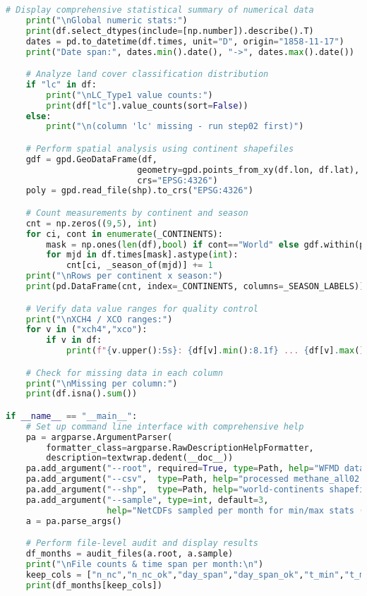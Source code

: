 \begin{lstlisting}[language=Python, caption=Dataset Health Check Algorithm, label=alg:step05_health_check, breaklines=true]
    # Display comprehensive statistical summary of numerical data
    print("\nGlobal numeric stats:")
    print(df.select_dtypes(include=[np.number]).describe().T)
    dates = pd.to_datetime(df.times, unit="D", origin="1858-11-17")
    print("Date span:", dates.min().date(), "->", dates.max().date())

    # Analyze land cover classification distribution
    if "lc" in df:
        print("\nLC_Type1 value counts:")
        print(df["lc"].value_counts(sort=False))
    else:
        print("\n(column 'lc' missing - run step02 first)")

    # Perform spatial analysis using continent shapefiles
    gdf = gpd.GeoDataFrame(df, 
                          geometry=gpd.points_from_xy(df.lon, df.lat), 
                          crs="EPSG:4326")
    poly = gpd.read_file(shp).to_crs("EPSG:4326")

    # Count measurements by continent and season
    cnt = np.zeros((9,5), int)
    for ci, cont in enumerate(_CONTINENTS):
        mask = np.ones(len(df),bool) if cont=="World" else gdf.within(poly.geometry[ci]).values
        for mjd in df.times[mask].astype(int):
            cnt[ci, _season_of(mjd)] += 1
    print("\nRows per continent x season:")
    print(pd.DataFrame(cnt, index=_CONTINENTS, columns=_SEASON_LABELS))

    # Verify data value ranges for quality control
    print("\nXCH4 / XCO ranges:")
    for v in ("xch4","xco"):
        if v in df: 
            print(f"{v.upper():5s}: {df[v].min():8.1f} ... {df[v].max():8.1f}")

    # Check for missing data in each column
    print("\nMissing per column:")
    print(df.isna().sum())

if __name__ == "__main__":
    # Set up command line interface with comprehensive help
    pa = argparse.ArgumentParser(
        formatter_class=argparse.RawDescriptionHelpFormatter,
        description=textwrap.dedent(__doc__))
    pa.add_argument("--root", required=True, type=Path, help="WFMD dataset root dir")
    pa.add_argument("--csv",  type=Path, help="processed methane_all02.txt")
    pa.add_argument("--shp",  type=Path, help="world-continents shapefile")
    pa.add_argument("--sample", type=int, default=3,
                    help="NetCDFs sampled per month for min/max stats (default 3)")
    a = pa.parse_args()

    # Perform file-level audit and display results
    df_months = audit_files(a.root, a.sample)
    print("\nFile counts & time span per month:\n")
    keep_cols = ["n_nc","n_nc_ok","day_span","day_span_ok","t_min","t_max","bad_ts"]
    print(df_months[keep_cols])


\end{lstlisting}
